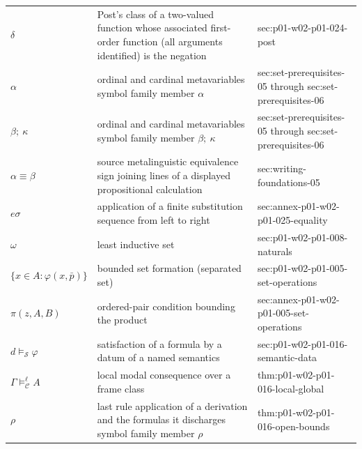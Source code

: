\begin{longtable}{@{}p{}p{}p{}@{}}
\(\delta\) & Post's class of a two-valued function whose associated first-order function (all arguments identified) is the negation & sec:\allowbreak{}p01-\allowbreak{}w02-\allowbreak{}p01-\allowbreak{}024-\allowbreak{}post \\
\(\alpha\) & ordinal and cardinal metavariables symbol family member \(\alpha\) & sec:\allowbreak{}set-\allowbreak{}prerequisites-\allowbreak{}05 through sec:\allowbreak{}set-\allowbreak{}prerequisites-\allowbreak{}06 \\
\(\beta;\allowbreak \ \kappa\) & ordinal and cardinal metavariables symbol family member \(\beta;\ \kappa\) & sec:\allowbreak{}set-\allowbreak{}prerequisites-\allowbreak{}05 through sec:\allowbreak{}set-\allowbreak{}prerequisites-\allowbreak{}06 \\
\(\alpha\equiv\beta\) & source metalinguistic equivalence sign joining lines of a displayed propositional calculation & sec:\allowbreak{}writing-\allowbreak{}foundations-\allowbreak{}05 \\
\(e\sigma\) & application of a finite substitution sequence from left to right & sec:\allowbreak{}annex-\allowbreak{}p01-\allowbreak{}w02-\allowbreak{}p01-\allowbreak{}025-\allowbreak{}equality \\
\(\omega\) & least inductive set & sec:\allowbreak{}p01-\allowbreak{}w02-\allowbreak{}p01-\allowbreak{}008-\allowbreak{}naturals \\
\(\{x\in A:\varphi(x,\allowbreak \bar p)\}\) & bounded set formation (separated set) & sec:\allowbreak{}p01-\allowbreak{}w02-\allowbreak{}p01-\allowbreak{}005-\allowbreak{}set-\allowbreak{}operations \\
\(\pi(z,\allowbreak A,\allowbreak B)\) & ordered-pair condition bounding the product & sec:\allowbreak{}annex-\allowbreak{}p01-\allowbreak{}w02-\allowbreak{}p01-\allowbreak{}005-\allowbreak{}set-\allowbreak{}operations \\
\(d\models_{\mathcal S}\varphi\) & satisfaction of a formula by a datum of a named semantics & sec:\allowbreak{}p01-\allowbreak{}w02-\allowbreak{}p01-\allowbreak{}016-\allowbreak{}semantic-\allowbreak{}data \\
\(\Gamma\models^{\ell}_{\mathcal C}A\) & local modal consequence over a frame class & thm:\allowbreak{}p01-\allowbreak{}w02-\allowbreak{}p01-\allowbreak{}016-\allowbreak{}local-\allowbreak{}global \\
\(\rho\) & last rule application of a derivation and the formulas it discharges symbol family member \(\rho\) & thm:\allowbreak{}p01-\allowbreak{}w02-\allowbreak{}p01-\allowbreak{}016-\allowbreak{}open-\allowbreak{}bounds \\

\end{longtable}
